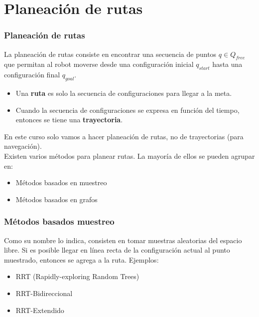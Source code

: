 \documentclass[10pt,spanish,aspectratio=1610]{beamer}
\begin{document}
\section{Planeación de rutas}
\begin{frame}\frametitle{Planeación de rutas}
  La planeación de rutas consiste en encontrar una secuencia de puntos $q\in Q_{free}$ que permitan al robot moverse desde una configuración inicial $q_{start}$ hasta una configuración final $q_{goal}$.
  \begin{itemize}
  \item Una \textbf{ruta} es solo la secuencia de configuraciones para llegar a la meta.
  \item Cuando la secuencia de configuraciones se expresa en función del tiempo, entonces se tiene una \textbf{trayectoria}. 
  \end{itemize}
  En este curso solo vamos a hacer planeación de rutas, no de trayectorias (para navegación).\\
  Existen varios métodos para planear rutas. La mayoría de ellos se pueden agrupar en:
  \begin{itemize}
  \item Métodos basados en muestreo
  \item Métodos basados en grafos
  \end{itemize}
\end{frame}

\begin{frame}\frametitle{Métodos basados muestreo}
  Como su nombre lo indica, consisten en tomar muestras aleatorias del espacio libre. Si es posible llegar en línea recta de la configuración actual al punto muestrado, entonces se agrega a la ruta.
  Ejemplos:
  \begin{itemize}
  \item RRT (Rapidly-exploring Random Trees)
  \item RRT-Bidireccional
  \item RRT-Extendido
  \end{itemize}
\end{frame}
\end{document}
